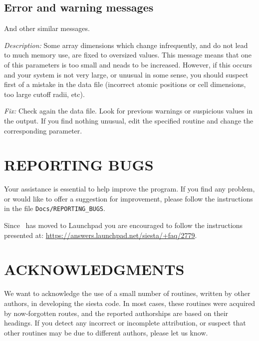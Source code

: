 \subsection{Error and warning messages}

\begin{description}
\itemsep 10pt
\parsep 0pt

\item[\texttt{chkdim: ERROR: In \textit{routine} dimension \textit{parameter} =
\textit{value}. It must be  ...}]

And other similar messages.

\textit{Description:} Some array dimensions which change infrequently,
and do not lead to much memory use, are fixed to oversized
values. This message means that one of this parameters is too small
and neads to be increased.  However, if this occurs and your system is
not very large, or unusual in some sense, you should suspect first of
a mistake in the data file (incorrect atomic positions or cell
dimensions, too large cutoff radii, etc).

\textit{Fix:} Check again the data file.  Look for previous warnings or
suspicious values in the output.  If you find nothing unusual, edit
the specified routine and change the corresponding parameter.  

\end{description}




\section{REPORTING BUGS}

Your assistance is essential to help improve the program. If you find
any problem, or would like to offer a suggestion for improvement,
please follow the instructions in the file
\texttt{Docs/REPORTING\_BUGS}. 

Since \siesta\ has moved to Launchpad you are encouraged to follow the
instructions presented at:
\url{https://answers.launchpad.net/siesta/+faq/2779}.



\section{ACKNOWLEDGMENTS}

We want to acknowledge the use of a small number of routines,
written by other authors, in developing the siesta code.
In most cases, these routines were acquired by now-forgotten
routes, and the reported authorships are based on their headings.
If you detect any incorrect or incomplete attribution, or suspect
that other routines may be due to different authors, please
let us know.

